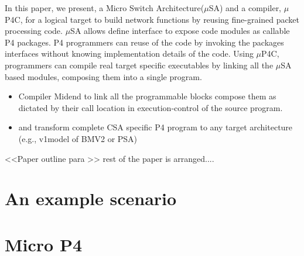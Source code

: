 \documentclass[10pt,sigconf,letterpaper,anonymous]{acmart}
\begin{document}
In this paper, we present, a Micro Switch Architecture($\mu$SA) and a compiler, $\mu$P4C, for a logical target to build network functions by reusing fine-grained packet processing code.
$\mu$SA allows define interface to expose code modules as callable P4 packages.
P4 programmers can reuse of the code by invoking the packages interfaces without knowing implementation details of the code.
Using $\mu$P4C, programmers can compile real target specific executables by linking all the $\mu$SA based modules, composing them into a single program.
\begin{itemize}
 \item Compiler Midend to link all the programmable blocks compose them as dictated by their call location in execution-control of the source program.
 \item and transform complete CSA specific P4 program to any target architecture (e.g., v1model of BMV2 or PSA)
\end{itemize}

%  
% 
%  
%  
%  

<<Paper outline para  >> rest of the paper is arranged....


\section{An example scenario}


% 
% 
% 
% 

\section{Micro P4}
\end{document}
